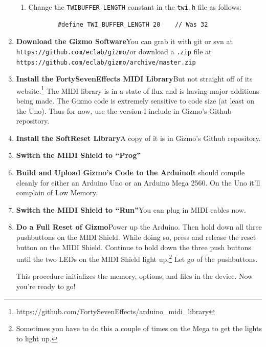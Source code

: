 \documentclass{article}
\begin{document}
\begin{enumerate}
\begin{enumerate}
\item Change the \texttt{TWIBUFFER\_LENGTH} constant in the \texttt{twi.h} file as follows:

\begin{verbatim}
        #define TWI_BUFFER_LENGTH 20    // Was 32
\end{verbatim}
\end{enumerate}

\item {\bf Download the Gizmo Software}\quad You can grab it with git or svn at\\
\texttt{https:/\!/github.com/eclab/gizmo/}\quad or download a \texttt{.zip} file at\\
\texttt{https:/\!/github.com/eclab/gizmo/archive/master.zip}

\item {\bf Install the FortySevenEffects MIDI Library}\quad But not straight off of its website.\footnote{https:/\!/github.com/FortySevenEffects/arduino\_midi\_library}  The MIDI library is in a state of flux and is having major additions being made.  The Gizmo code is extremely sensitive to code size (at least on the Uno).  Thus for now, use the version I include in Gizmo's Github repository.

\item {\bf Install the SoftReset Library}\quad A copy of it is in Gizmo's Github repository.

\item {\bf Switch the MIDI Shield to ``Prog''}

\item {\bf Build and Upload Gizmo's Code to the Arduino}\quad  It should compile cleanly for either an Arduino Uno or an Arduino Mega 2560.  On the Uno it'll complain of Low Memory.

\item {\bf Switch the MIDI Shield to ``Run''}\quad  You can plug in MIDI cables now.

\item {\bf Do a Full Reset of Gizmo}\quad Power up the Arduino.  Then hold down all three pushbuttons on the MIDI Shield.  While doing so, press and release the reset button on the MIDI Shield.  Continue to hold down the three push buttons until the two LEDs on the MIDI Shield light up.\footnote{Sometimes you have to do this a couple of times on the Mega to get the lights to light up.}  Let go of the pushbuttons.  

This procedure initializes the memory, options, and files in the device.  Now you're ready to go!

\end{enumerate}
\end{document}
